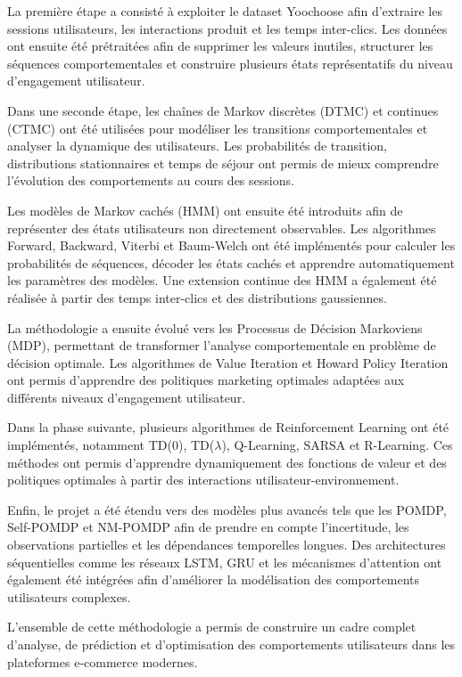 \documentclass[11pt,a4paper]{article}
\begin{document}
La première étape a consisté à exploiter le dataset Yoochoose afin d’extraire les sessions utilisateurs, les interactions produit et les temps inter-clics. Les données ont ensuite été prétraitées afin de supprimer les valeurs inutiles, structurer les séquences comportementales et construire plusieurs états représentatifs du niveau d’engagement utilisateur.

Dans une seconde étape, les chaînes de Markov discrètes (DTMC) et continues (CTMC) ont été utilisées pour modéliser les transitions comportementales et analyser la dynamique des utilisateurs. Les probabilités de transition, distributions stationnaires et temps de séjour ont permis de mieux comprendre l’évolution des comportements au cours des sessions.

Les modèles de Markov cachés (HMM) ont ensuite été introduits afin de représenter des états utilisateurs non directement observables. Les algorithmes Forward, Backward, Viterbi et Baum-Welch ont été implémentés pour calculer les probabilités de séquences, décoder les états cachés et apprendre automatiquement les paramètres des modèles. Une extension continue des HMM a également été réalisée à partir des temps inter-clics et des distributions gaussiennes.

La méthodologie a ensuite évolué vers les Processus de Décision Markoviens (MDP), permettant de transformer l’analyse comportementale en problème de décision optimale. Les algorithmes de Value Iteration et Howard Policy Iteration ont permis d’apprendre des politiques marketing optimales adaptées aux différents niveaux d’engagement utilisateur.

Dans la phase suivante, plusieurs algorithmes de Reinforcement Learning ont été implémentés, notamment TD(0), TD($\lambda$), Q-Learning, SARSA et R-Learning. Ces méthodes ont permis d’apprendre dynamiquement des fonctions de valeur et des politiques optimales à partir des interactions utilisateur-environnement.

Enfin, le projet a été étendu vers des modèles plus avancés tels que les POMDP, Self-POMDP et NM-POMDP afin de prendre en compte l’incertitude, les observations partielles et les dépendances temporelles longues. Des architectures séquentielles comme les réseaux LSTM, GRU et les mécanismes d’attention ont également été intégrées afin d’améliorer la modélisation des comportements utilisateurs complexes.

L’ensemble de cette méthodologie a permis de construire un cadre complet d’analyse, de prédiction et d’optimisation des comportements utilisateurs dans les plateformes e-commerce modernes.
\newpage
\end{document}
